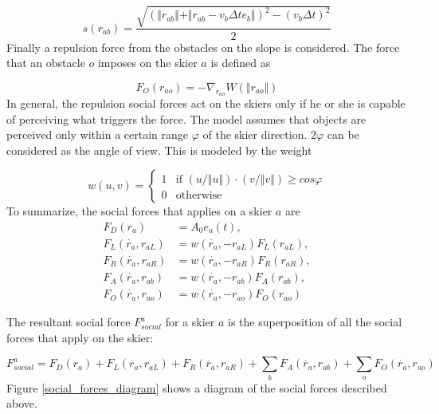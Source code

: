 \documentclass[12pt,a4paper,twoside]{book}
\begin{document}
\begin{equation}\label{skier_s}
s(r_{ab})=\frac{\sqrt{(\Vert r_{ab} \Vert + \Vert r_{ab}-v_b \Delta t e_b \Vert )^2-(v_b \Delta t)^2}}{2}
\end{equation}
Finally a repulsion force from the obstacles on the slope is considered. The force that an obstacle $o$ imposes on the skier $a$ is defined as

\begin{equation}\label{obstacle_force}
F_O(r_{ao})=-\nabla_{r_{ao}}W(\Vert r_{ao} \Vert )
\end{equation}
In general, the repulsion social forces act on the skiers only if he or she is capable of perceiving what triggers the force. The model assumes that objects are perceived only within a certain range $\varphi$ of the skier direction. $2\varphi$ can be considered as the angle of view. This is modeled by the weight

\begin{equation}\label{visibility}
w(u,v)=\begin{cases}
  1 & \text{if $(u/\Vert u \Vert)\cdot (v/\Vert v \Vert) \geq cos \varphi$} \\
  0 & \text{otherwise }
  \end{cases}
\end{equation}
To summarize, the social forces that applies on a skier $a$ are
\begin{align}\label{social_forces_tb}
F_D(r_a)&=A_0 e_a(t),\\
F_L(\dot{r_a},r_{aL})&=w(\dot{r_a},-r_{aL})F_L(r_{aL}),\\
F_R(\dot{r_a},r_{aR})&=w(\dot{r_a},-r_{aR})F_R(r_{aR}),\\
F_A(\dot{r_a},r_{ab})&=w(\dot{r_a},-r_{ab})F_A(r_{ab}),\\
F_O(\dot{r_a},r_{ao})&=w(\dot{r_a},-r_{ao})F_O(r_{ao})
\end{align}

The resultant social force $F^a_{social}$ for a skier $a$ is the superposition of all the social forces that apply on the skier:

\begin{equation}
F^a_{social}=F_D(r_a)+F_L(\dot{r_a},r_{aL})+F_R(\dot{r_a},r_{aR})+\sum_b F_A(\dot{r_a},r_{ab})+\sum_o F_O(\dot{r_a},r_{ao})\nonumber
\end{equation}
Figure \ref{social_forces_diagram} shows a diagram of the social forces described above.
\end{document}
